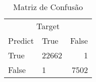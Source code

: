 \documentclass[
	12pt,				    %
	openright,			    %
	oneside,			    %
	a4paper,			    %
    sumario=tradicional,    %
	english,			    %
	brazil,				    %
	]{abntex2}
\begin{document}
\begin{table}[htbp]
  \centering
    \caption[Matriz de Confusão]{Matriz de Confusão}
    \label{tab:matriz}
	\begin{tabular}{llr}
		\hline
		\multicolumn{3}{c}{Target} \\
		\cline{2-3}
			Predict    & True & False \\
		\hline
			True      & 22662    & 1      \\
			False     & 1        & 7502       \\
		\hline
	\end{tabular}
\end{table}%

\postextual



\end{document}
